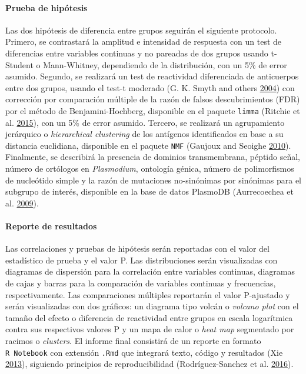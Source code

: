 \documentclass[a4paper]{article}
\let\oldparagraph\paragraph
\renewcommand{\paragraph}[1]{\oldparagraph{#1}\mbox{}}
\begin{document}
\paragraph{Prueba de hipótesis}\label{prueba-de-hipotesis}

Las dos hipótesis de diferencia entre grupos seguirán el siguiente
protocolo. Primero, se contrastará la amplitud e intensidad de respuesta
con un test de diferencias entre variables continuas y no pareadas de
dos grupos usando t-Student o Mann-Whitney, dependiendo de la
distribución, con un 5\% de error asumido. Segundo, se realizará un test
de reactividad diferenciada de anticuerpos entre dos grupos, usando el
test-t moderado (G. K. Smyth and others
\protect\hyperlink{ref-smyth2004ebayes}{2004}) con corrección por
comparación múltiple de la razón de falsos descubrimientos (FDR) por el
método de Benjamini-Hochberg, disponible en el paquete \texttt{limma}
(Ritchie et al. \protect\hyperlink{ref-limma}{2015}), con un 5\% de
error asumido. Tercero, se realizará un agrupamiento jerárquico o
\emph{hierarchical clustering} de los antígenos identificados en base a
su distancia euclidiana, disponible en el paquete \texttt{NMF} (Gaujoux
and Seoighe \protect\hyperlink{ref-Gaujoux2010NMF}{2010}). Finalmente,
se describirá la presencia de dominios transmembrana, péptido señal,
número de ortólogos en \emph{Plasmodium}, ontología génica, número de
polimorfismos de nucleótido simple y la razón de mutaciones no-sinónimas
por sinónimas para el subgrupo de interés, disponible en la base de
datos PlasmoDB (Aurrecoechea et al.
\protect\hyperlink{ref-plasmodb}{2009}).

\paragraph{Reporte de resultados}\label{reporte-de-resultados}

Las correlaciones y pruebas de hipótesis serán reportadas con el valor
del estadístico de prueba y el valor P. Las distribuciones serán
visualizadas con diagramas de dispersión para la correlación entre
variables continuas, diagramas de cajas y barras para la comparación de
variables continuas y frecuencias, respectivamente. Las comparaciones
múltiples reportarán el valor P-ajustado y serán visualizadas con dos
gráficos: un diagrama tipo volcán o \emph{volcano plot} con el tamaño
del efecto o diferencia de reactividad entre grupos en escala
logarítmica contra sus respectivos valores P y un mapa de calor o
\emph{heat map} segmentado por racimos o \emph{clusters}. El informe
final consistirá de un reporte en formato \texttt{R\ Notebook} con
extensión \texttt{.Rmd} que integrará texto, código y resultados (Xie
\protect\hyperlink{ref-knitr}{2013}), siguiendo principios de
reproducibilidad (Rodríguez-Sanchez et al.
\protect\hyperlink{ref-CienciaReproducible2016}{2016}).
\end{document}
